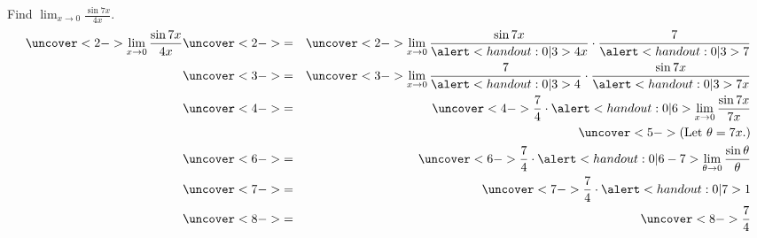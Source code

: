 \begin{frame}
\begin{example}[Example 5, p. 153]
Find $\lim_{x\rightarrow 0}\frac{\sin 7x}{4x}$.
\begin{eqnarray*}
\uncover<2->{%
\lim_{x\rightarrow 0} \frac{\sin 7x}{4x}%
}%
& \uncover<2->{ = } & %
\uncover<2->{%
\lim_{x\rightarrow 0} \frac{\sin 7x}{\alert<handout:0| 3>{4}x}\cdot \frac{7}{\alert<handout:0| 3>{7}}%
}\\%
& \uncover<3->{ = } & %
\uncover<3->{%
\lim_{x\rightarrow 0} \frac{7}{\alert<handout:0| 3>{4}}\cdot \frac{\sin 7x}{\alert<handout:0| 3>{7}x}%
}\\%
& \uncover<4->{ = } & %
\uncover<4->{%
\frac{7}{4}\cdot \alert<handout:0| 6>{\lim_{x\rightarrow 0}  \frac{\sin 7x}{7x}}%
}\\%
& & \uncover<5->{\textrm{(Let $\theta = 7x$.)}}\\%
& \uncover<6->{ = } & %
\uncover<6->{%
\frac{7}{4}\cdot \alert<handout:0| 6-7>{\lim_{\theta \rightarrow 0}  \frac{\sin \theta}{\theta}}%
}\\%
& \uncover<7->{ = } & %
\uncover<7->{%
\frac{7}{4}\cdot \alert<handout:0| 7>{1}%
}\\%
& \uncover<8->{ = } & %
\uncover<8->{%
\frac{7}{4}%
}%
\end{eqnarray*}
\end{example}
\end{frame}
